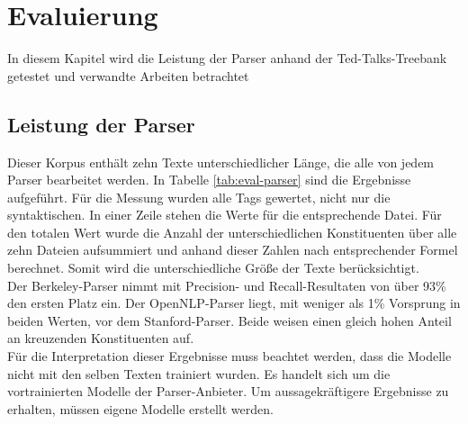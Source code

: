 %
\chapter{Evaluierung}
\label{sec:eval}

In diesem Kapitel wird die Leistung der Parser anhand der Ted-Talks-Treebank getestet und verwandte Arbeiten betrachtet

\section{Leistung der Parser}
Dieser Korpus enthält zehn Texte unterschiedlicher Länge, die alle von jedem Parser bearbeitet werden. In Tabelle \ref{tab:eval-parser} sind die Ergebnisse aufgeführt. Für die Messung wurden alle Tags gewertet, nicht nur die syntaktischen. In einer Zeile stehen die Werte für die entsprechende Datei. Für den totalen Wert wurde die Anzahl der unterschiedlichen Konstituenten über alle zehn Dateien aufsummiert und anhand dieser Zahlen nach entsprechender Formel berechnet. Somit wird die unterschiedliche Größe der Texte berücksichtigt. \\
Der Berkeley-Parser nimmt mit Precision- und Recall-Resultaten von über 93\% den ersten Platz ein. Der OpenNLP-Parser liegt, mit weniger als 1\% Vorsprung in beiden Werten, vor dem Stanford-Parser. Beide weisen einen gleich hohen Anteil an kreuzenden Konstituenten auf.\\
Für die Interpretation dieser Ergebnisse muss beachtet werden, dass die Modelle nicht mit den selben Texten trainiert wurden. Es handelt sich um die vortrainierten Modelle der Parser-Anbieter. Um aussagekräftigere Ergebnisse zu erhalten, müssen eigene Modelle erstellt werden. 
